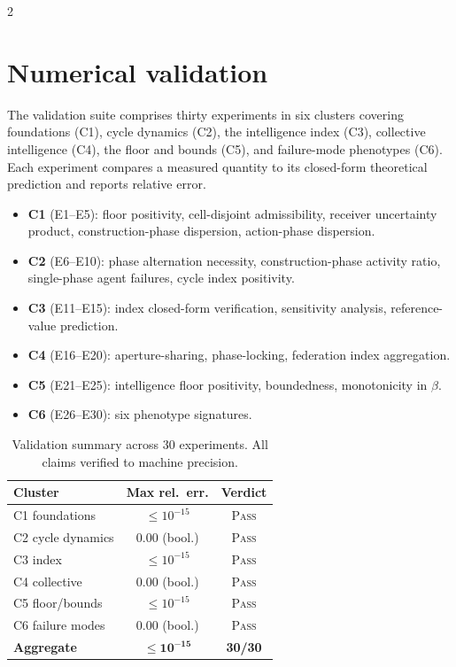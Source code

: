 \begin{multicols}{2}

\section{Numerical validation}
\label{sec:ch05-validation}

The validation suite comprises thirty experiments in six clusters covering foundations
(C1), cycle dynamics (C2), the intelligence index (C3), collective intelligence (C4),
the floor and bounds (C5), and failure-mode phenotypes (C6). Each experiment compares a
measured quantity to its closed-form theoretical prediction and reports relative error.

\begin{itemize}
\item \textbf{C1} (E1--E5): floor positivity, cell-disjoint admissibility, receiver
  uncertainty product, construction-phase dispersion, action-phase dispersion.
\item \textbf{C2} (E6--E10): phase alternation necessity, construction-phase activity
  ratio, single-phase agent failures, cycle index positivity.
\item \textbf{C3} (E11--E15): index closed-form verification, sensitivity analysis,
  reference-value prediction.
\item \textbf{C4} (E16--E20): aperture-sharing, phase-locking, federation index
  aggregation.
\item \textbf{C5} (E21--E25): intelligence floor positivity, boundedness, monotonicity
  in $\beta$.
\item \textbf{C6} (E26--E30): six phenotype signatures.
\end{itemize}

\begin{table}[H]\centering\small
\begin{tabular}{lcc}
\toprule
\textbf{Cluster} & \textbf{Max rel.\ err.} & \textbf{Verdict}\\
\midrule
C1 foundations       & $\le 10^{-15}$ & \textsc{Pass}\\
C2 cycle dynamics    & $0.00$ (bool.) & \textsc{Pass}\\
C3 index             & $\le 10^{-15}$ & \textsc{Pass}\\
C4 collective        & $0.00$ (bool.) & \textsc{Pass}\\
C5 floor/bounds      & $\le 10^{-15}$ & \textsc{Pass}\\
C6 failure modes     & $0.00$ (bool.) & \textsc{Pass}\\
\midrule
\textbf{Aggregate}   & $\mathbf{\le 10^{-15}}$ & \textbf{30/30}\\
\bottomrule
\end{tabular}
\caption{Validation summary across $30$ experiments. All claims verified to machine
precision.}
\label{tab:ch05-validation}
\end{table}


\end{multicols}
